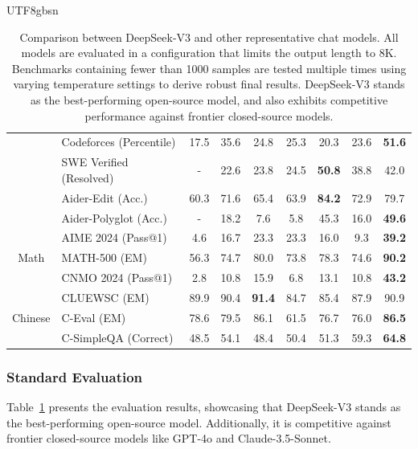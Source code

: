 \documentclass[11pt, a4paper, logo, copyright, nonumbering]{deepseek}
\newcommand{\dsviii}{DeepSeek-V3}
\begin{document}
\begin{CJK*}{UTF8}{gbsn}
\begin{table}[h]
\begin{tabular}{@{}c l | c  c | c c c c| c@{}}
    & Codeforces {\tiny (Percentile)} & 17.5 & 35.6 & 24.8 & 25.3 & 20.3 & 23.6 & \textbf{51.6} \\
    & SWE Verified {\tiny (Resolved)} &-&22.6& 23.8 & 24.5 & \textbf{50.8}&38.8&42.0\\
    & Aider-Edit {\tiny (Acc.)} & 60.3& 71.6 & 65.4 & 63.9 & \textbf{84.2} &72.9&79.7 \\
    & Aider-Polyglot {\tiny (Acc.)}  & -& 18.2 & 7.6 & 5.8 & 45.3&16.0&\textbf{49.6} \\
    \midrule
    \multirow{3}{*}{Math} & AIME 2024 {\tiny (Pass@1)} & 4.6 & 16.7 & 23.3 & 23.3 & 16.0 & 9.3 & \textbf{39.2} \\
    & MATH-500 {\tiny (EM)} &  56.3 & 74.7 & 80.0 & 73.8 & 78.3 & 74.6&\textbf{90.2} \\
    & CNMO 2024 {\tiny (Pass@1)} & 2.8 & 10.8 & 15.9& 6.8& 13.1 & 10.8 &\textbf{43.2} \\
    \midrule
    \multirow{3}{*}{Chinese} & CLUEWSC {\tiny (EM)} & 89.9& 90.4 & \textbf{91.4} & 84.7 & 85.4 & 87.9 & 90.9\\
    & C-Eval {\tiny (EM)} & 78.6& 79.5 & 86.1 & 61.5 & 76.7 & 76.0 & \textbf{86.5}\\
     & C-SimpleQA {\tiny (Correct)}  & 48.5& 54.1 & 48.4 & 50.4 & 51.3 & 59.3 & \textbf{64.8}\\
    \bottomrule
    \end{tabular}
    \caption{
        Comparison between \dsviii{} and other representative chat models. 
        All models are evaluated in a configuration that limits the output length to 8K.
        Benchmarks containing fewer than 1000 samples are tested multiple times using varying temperature settings to derive robust final results.
        \dsviii{} stands as the best-performing open-source model, and also exhibits competitive performance against frontier closed-source models. 
    }
    \label{tab:chat}
\end{table}

\subsubsection{Standard Evaluation}

Table~\ref{tab:chat} presents the evaluation results, showcasing that \dsviii{} stands as the best-performing open-source model. 
Additionally, it is competitive against frontier closed-source models like GPT-4o and Claude-3.5-Sonnet. 


\end{CJK*}
\end{document}
